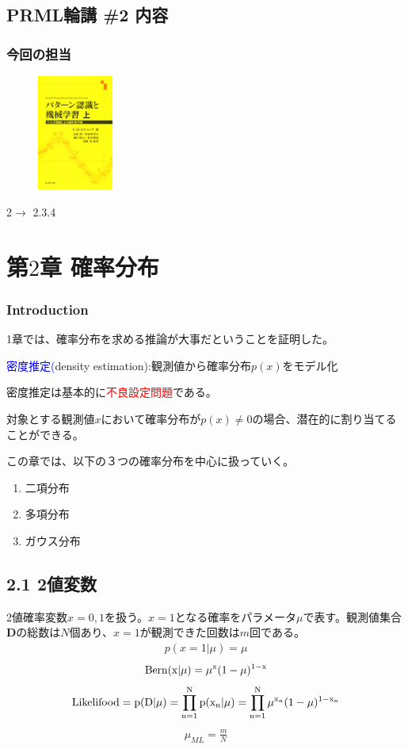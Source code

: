 \documentclass[dvipdfmx]{beamer}
\theoremstyle{definition}
\begin{document}
\subsection{PRML輪講 \#2 内容}
\begin{frame}
  \frametitle{今回の担当}
  \begin{figure}[htb]
    \centering
    \includegraphics[width=2.5cm,clip]{res/prml.eps}
  \end{figure}
  2$\to$ 2.3.4 
\end{frame}

\section{第$2$章 \enspace 確率分布}
\begin{frame}
  \frametitle{Introduction}
  1章では、確率分布を求める推論が大事だということを証明した。
  
  \textcolor{blue}{密度推定(}density estimation):観測値から確率分布$p(x)$をモデル化
  
  密度推定は基本的に\textcolor{red}{不良設定問題}である。
  
  対象とする観測値$x$において確率分布が$p(x)\neq0$の場合、潜在的に割り当てることができる。
  
  この章では、以下の３つの確率分布を中心に扱っていく。
  \begin{enumerate}
    \item 二項分布
    \item 多項分布
    \item ガウス分布
  \end{enumerate}
\end{frame}

\subsection{2.1 2値変数}
\begin{frame}
  2値確率変数$x={0,1}$を扱う。$x=1$となる確率をパラメータ$\mu$で表す。観測値集合$\bm{D}$の総数は$N$個あり、$x=1$が観測できた回数は$m$回である。
  \begin{gather*}
    p(x=1|\mu) =\mu
  \end{gather*}
  \begin{gather*}
    \rm{Bern}(x|\mu) = \mu^x(1-\mu)^{1-x}
  \end{gather*}
  \begin{gather*}
    \rm{Likelifood} = p(\bm{D}|\mu)= \prod_{n=1}^{N} p(x_n|\mu) = \prod_{n=1}^{N} \mu^{x_n}(1-\mu)^{1-x_n}
  \end{gather*}
  \begin{gather*}
    \mu_{ML} = \frac{m}{N}
  \end{gather*}
\end{frame}
\end{document}
